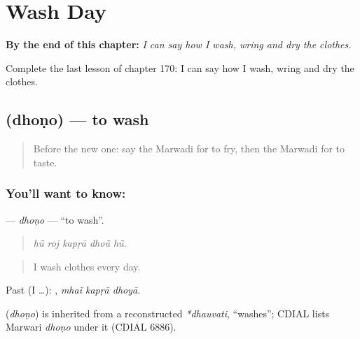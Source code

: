 
\chapter{Wash Day}
\label{ch:mw-wash-day}

\begin{chapteropening}
\textbf{By the end of this chapter:} \emph{I can say how I wash, wring and dry the clothes.}

Complete the last lesson of chapter 170: I can say how I wash, wring and dry the clothes.
\end{chapteropening}

\section[\texorpdfstring{\mw{धोणो} (dhoṇo)}{धोणो (dhoṇo)}]{ (dhoṇo) — to wash}

\label{lesson:MW-C170-dhono}



\begin{quote}
Before the new one: say the Marwadi for to fry, then the Marwadi for to taste.
\end{quote}

\subsection*{You'll want to know: }
\textbf{} — \emph{dhoṇo} — \textquotedblleft{}to wash\textquotedblright{}.

\begin{quote}
    
\end{quote}

\begin{quote}
\emph{hū̃ roj kapṛā dhoū̃ hū̃.}
\end{quote}

\begin{quote}
I wash clothes every day.
\end{quote}

Past (I …):   , \emph{mhaĩ kapṛā dhoyā}.

\begin{cousinweb}
\textbf{} (\emph{dhoṇo}) is inherited from a reconstructed \emph{*dhauvati}, \textquotedblleft{}washes\textquotedblright{}; CDIAL lists Marwari \emph{dhoṇo} under it (CDIAL 6886).
\end{cousinweb}

